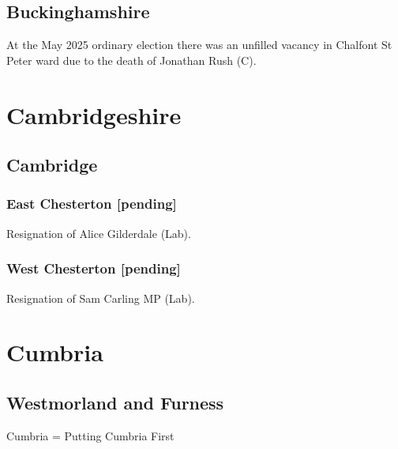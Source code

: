 \documentclass[a4paper,openany]{book}
\begin{document}
\begin{resultsiii}
\subsection*{Buckinghamshire}

At the May 2025 ordinary election there was an unfilled vacancy in Chalfont St Peter ward due to the death of Jonathan Rush (C).%

\section{Cambridgeshire}

\subsection*{Cambridge}

\subsubsection*{East Chesterton \hspace*{\fill}\nolinebreak[1]%
	\enspace\hspace*{\fill}
	[pending]}


Resignation of Alice Gilderdale (Lab).

\subsubsection*{West Chesterton \hspace*{\fill}\nolinebreak[1]%
	\enspace\hspace*{\fill}
	[pending]}


Resignation of Sam Carling MP (Lab).

\section{Cumbria}

\subsection*{Westmorland and Furness}

Cumbria = Putting Cumbria First


\end{resultsiii}
\end{document}
